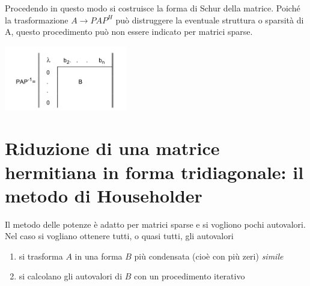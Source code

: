 Procedendo in questo modo si costruisce la forma di Schur della matrice.
Poich\'e la trasformazione $A \rightarrow P AP^H$ pu\`o distruggere la
eventuale struttura o sparsit\`a di A, questo procedimento pu\`o non
essere indicato per matrici sparse.
\begin{center}
\includegraphics[width=0.4\textwidth]{imgs/img06.png}
\end{center}

\section{Riduzione di una matrice hermitiana in forma
tridiagonale: il metodo di Householder}
Il metodo delle potenze \`e adatto per matrici sparse e
si vogliono pochi autovalori. \\
Nel caso si vogliano ottenere tutti, o quasi tutti, gli autovalori
\begin{enumerate}
\item si trasforma $A$ in una forma $B$ più condensata (cioè con più
  zeri) \emph{simile}
\item si calcolano gli autovalori di $B$ con un procedimento iterativo
\end{enumerate}


